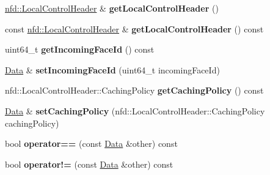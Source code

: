 \begin{DoxyCompactItemize}
\item 
\hyperlink{classndn_1_1nfd_1_1LocalControlHeader}{nfd\+::\+Local\+Control\+Header} \& {\bfseries get\+Local\+Control\+Header} ()\hypertarget{classndn_1_1Data_a22ee7187d9e7d7a4284d79d02b36d094}{}\label{classndn_1_1Data_a22ee7187d9e7d7a4284d79d02b36d094}

\item 
const \hyperlink{classndn_1_1nfd_1_1LocalControlHeader}{nfd\+::\+Local\+Control\+Header} \& {\bfseries get\+Local\+Control\+Header} () const\hypertarget{classndn_1_1Data_ad8a12d241cc0635a24baa63aa03b83e0}{}\label{classndn_1_1Data_ad8a12d241cc0635a24baa63aa03b83e0}

\item 
uint64\+\_\+t {\bfseries get\+Incoming\+Face\+Id} () const\hypertarget{classndn_1_1Data_a61f9369556921f0a49e1d414a81f89b2}{}\label{classndn_1_1Data_a61f9369556921f0a49e1d414a81f89b2}

\item 
\hyperlink{classndn_1_1Data}{Data} \& {\bfseries set\+Incoming\+Face\+Id} (uint64\+\_\+t incoming\+Face\+Id)\hypertarget{classndn_1_1Data_aaaa9ad0e8e1b429463c8eb3ea6712a02}{}\label{classndn_1_1Data_aaaa9ad0e8e1b429463c8eb3ea6712a02}

\item 
nfd\+::\+Local\+Control\+Header\+::\+Caching\+Policy {\bfseries get\+Caching\+Policy} () const\hypertarget{classndn_1_1Data_a13a60fe89fc27fe34e6d8c95014fa9c8}{}\label{classndn_1_1Data_a13a60fe89fc27fe34e6d8c95014fa9c8}

\item 
\hyperlink{classndn_1_1Data}{Data} \& {\bfseries set\+Caching\+Policy} (nfd\+::\+Local\+Control\+Header\+::\+Caching\+Policy caching\+Policy)\hypertarget{classndn_1_1Data_af89347ebcaf22e7d413d08f65ee499d7}{}\label{classndn_1_1Data_af89347ebcaf22e7d413d08f65ee499d7}

\item 
bool {\bfseries operator==} (const \hyperlink{classndn_1_1Data}{Data} \&other) const\hypertarget{classndn_1_1Data_a95039c5fb9a308a709f0756eca80952d}{}\label{classndn_1_1Data_a95039c5fb9a308a709f0756eca80952d}

\item 
bool {\bfseries operator!=} (const \hyperlink{classndn_1_1Data}{Data} \&other) const\hypertarget{classndn_1_1Data_a1ab5b2fabb4adce958f7524de0eb1066}{}\label{classndn_1_1Data_a1ab5b2fabb4adce958f7524de0eb1066}

\end{DoxyCompactItemize}
